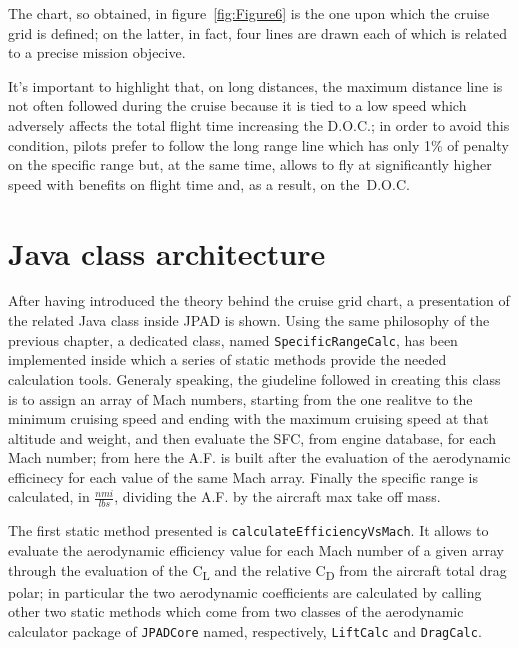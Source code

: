 \bigskip
\noindent
The chart, so obtained, in figure~\ref{fig:Figure6} is the one upon which the cruise grid is defined; on the latter, in fact, four lines are drawn each of which is related to a precise mission objecive.

It's important to highlight that, on long distances, the maximum distance line is not often followed during the cruise because it is tied to a low speed which adversely affects the total flight time increasing the D.O.C.; in order to avoid this condition, pilots prefer to follow the long range line which has only 1\% of penalty on the specific range but, at the same time, allows to fly at significantly higher speed with benefits on flight time and, as a result, on the~D.O.C.

\section{Java class architecture}
After having introduced the theory behind the cruise grid chart, a presentation of the related Java class inside JPAD is shown. Using the same philosophy of the previous chapter, a dedicated class, named \lstinline[language=Java]!SpecificRangeCalc!, has been implemented inside which a series of static methods provide the needed calculation tools. Generaly speaking, the giudeline followed in creating this class is to assign an array of Mach numbers, starting from the one realitve to the minimum cruising speed and ending with the maximum cruising speed at that altitude and weight, and then evaluate the SFC, from engine database, for each Mach number; from here the A.F. is built after the evaluation of the aerodynamic efficinecy for each value of the same Mach array. Finally the specific range is calculated, in $\frac{\si{nmi}}{\si{lbs}}$, dividing the A.F. by the aircraft max take off mass.

\bigskip
\noindent
The first static method presented is \lstinline[language=Java]!calculateEfficiencyVsMach!. It allows to evaluate the aerodynamic efficiency value for each  Mach number of a given array through the evaluation of the C\textsubscript{L} and the relative C\textsubscript{D} from the aircraft total drag polar; in particular the two aerodynamic coefficients are calculated by calling other two static methods which come from two classes of the aerodynamic calculator package of \lstinline[language=Java]!JPADCore! named, respectively, \lstinline[language=Java]!LiftCalc! and \lstinline[language=Java]!DragCalc!.

